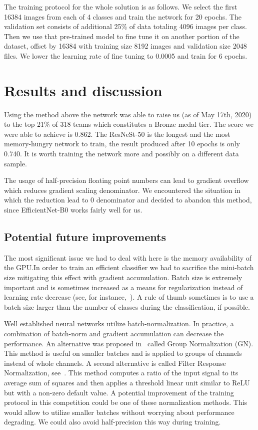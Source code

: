 \documentclass[letterpaper]{article}
\begin{document}
The training protocol for the whole solution is as follows. We select the first 16384 images from each of 4 classes and train the network for 20 epochs. The validation set consists of additional 25\% of data totaling 4096 images per class. Then we use that pre-trained model to fine tune it on another portion of the dataset, offset by 16384 with training size 8192 images and validation size 2048 files. We lower the learning rate of fine tuning to 0.0005 and train for 6 epochs.

\section{Results and discussion}

Using the method above the network was able to raise us (as of May 17th, 2020) to the top 21\% of 318 teams which constitutes a Bronze medal tier. The score we were able to achieve is 0.862. The ResNeSt-50 is the longest and the most memory-hungry network to train, the result produced after 10 epochs is only 0.740. It is worth training the network more and possibly on a different data sample.

The usage of half-precision floating point numbers can lead to gradient overflow which reduces gradient scaling denominator. We encountered the situation in which the reduction lead to 0 denominator and decided to abandon this method, since EfficientNet-B0 works fairly well for us.

\subsection{Potential future improvements}
The most significant issue we had to deal with here is the memory availability of the GPU.\@ In order to train an efficient classifier we had to sacrifice the mini-batch size mitigating this effect with gradient accumulation. Batch size is extremely important and is sometimes increased as a means for regularization instead of learning rate decrease (see, for instance,~\cite{smith2017don}). A rule of thumb sometimes is to use a batch size larger than the number of classes during the classification, if possible.

Well established neural networks utilize batch-normalization. In practice, a combination of batch-norm and gradient accumulation can decrease the performance. An alternative was proposed in~\cite{wu2018group} called Group Normalization (GN). This method is useful on smaller batches and is applied to groups of channels instead of whole channels. A second alternative is called Filter Response Normalization, see~\cite{singh2019filter}.  This method computes a ratio of the input signal to its average sum of squares and then applies a threshold linear unit similar to ReLU but with a non-zero default value. A potential improvement of the training protocol in this competition could be one of these normalization methods. This would allow to utilize smaller batches without worrying about performance degrading. We could also avoid half-precision this way during training.
\end{document}
